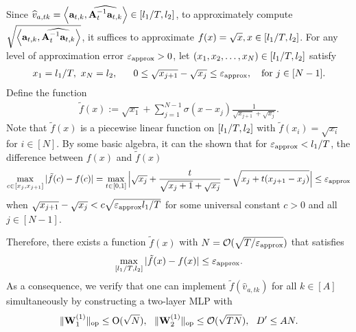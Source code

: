 Since $\widehat v_{a,tk}=\left\langle{\mathbf a}_{t,k},\widehat{{\mathbf A}_t^{-1}{\mathbf a}_{t,k}}\right\rangle\in[{l_1}/T,{l_2}]$, to approximately compute $\sqrt{\left\langle{\mathbf a}_{t,k},\widehat{{\mathbf A}_t^{-1}{\mathbf a}_{t,k}}\right\rangle}$, it suffices to approximate $f(x)=\sqrt{x},x\in[{l_1}/T,{l_2}]$. For any  level of approximation error $\varepsilon_{\mathrm{approx}}>0$, let $(x_1,x_2,\ldots,x_N)\in[{l_1}/T,{l_2}]$ satisfy
\begin{align*}
x_1={l_1}/T,~x_N={l_2},   ~~~~~
    0\leq\sqrt{x_{j+1}}-\sqrt{x_{j}}\leq\varepsilon_{\mathrm{approx}},~~\text{ for }j\in[N-1].
\end{align*}
Define the function
\begin{align*}
    \tilde f(x):=\sqrt{x_1}+\sum_{j=1}^{N-1}\sigma(x-x_{j})\frac{1}{\sqrt{x_{j+1}}+\sqrt{x_j}}.
\end{align*} Note that $\tilde f(x)$ is a piecewise linear function on $[{l_1}/T,{l_2}]$ with $\tilde f(x_i)=\sqrt{x_i}$ for $i\in[N]$. By some basic algebra,  it can the shown that for $\varepsilon_{\mathrm{approx}}<{l_1}/T$, the difference between $f(x)$ and $\tilde f(x)$
\begin{align*}
   \max_{c\in[x_j,x_{j+1}]} |\tilde f(c)-f(c)|=\max_{t\in[0,1]}\Big|\sqrt{x_j}+\frac{t}{\sqrt{x_j+1}+\sqrt{x_j}}-\sqrt{x_j+t(x_{j+1}-x_j)}\Big|\leq\varepsilon_{\mathrm{approx}}
\end{align*} when $\sqrt{x_{j+1}}-\sqrt{x_{j}}<c\sqrt{\varepsilon_{\mathrm{approx}}{l_1}/T}$ for some universal constant $c>0$ and all $j\in[N-1]$. 

Therefore, 
 there exists a function $\tilde f(x)$ with $N=\mathcal{O}(\sqrt{T/\varepsilon_{\mathrm{approx}}})$ that satisfies $$\max_{[{l_1}/T,{l_2}]}|\tilde f(x)-f(x)|\leq\varepsilon_{\mathrm{approx}}.$$ 
 As a consequence, we verify that one can implement $\tilde f(\hat v_{a,tk})$ for all $k\in[A]$ simultaneously  by constructing a two-layer MLP with $$\|{{\mathbf W}_1^{(1)}}\|_{\mathrm{op}}\leq {\mathrm{O}}(\sqrt{N}),~~\|{{\mathbf W}_2^{(1)}}\|_{\mathrm{op}}\leq \mathcal{O}(\sqrt{TN}),~~{D'}\leq AN.$$






 
